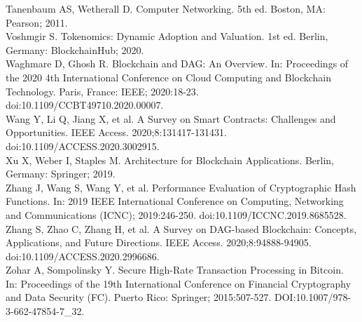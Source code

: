 \documentclass[12pt,a4paper,twocolumn]{article}
\begin{document}
Tanenbaum AS, Wetherall D. Computer Networking. 5th ed. Boston, MA: Pearson; 2011.\\

Voshmgir S. Tokenomics: Dynamic Adoption and Valuation. 1st ed. Berlin, Germany: BlockchainHub; 2020.\\

Waghmare D, Ghosh R. Blockchain and DAG: An Overview. In: Proceedings of the 2020 4th International Conference on Cloud Computing and Blockchain Technology. Paris, France: IEEE; 2020:18-23. doi:10.1109/CCBT49710.2020.00007.\\

Wang Y, Li Q, Jiang X, et al. A Survey on Smart Contracts: Challenges and Opportunities. IEEE Access. 2020;8:131417-131431. doi:10.1109/ACCESS.2020.3002915.\\

Xu X, Weber I, Staples M. Architecture for Blockchain Applications. Berlin, Germany: Springer; 2019.\\

Zhang J, Wang S, Wang Y, et al. Performance Evaluation of Cryptographic Hash Functions. In: 2019 IEEE International Conference on Computing, Networking and Communications (ICNC); 2019:246-250. doi:10.1109/ICCNC.2019.8685528.\\

Zhang S, Zhao C, Zhang H, et al. A Survey on DAG-based Blockchain: Concepts, Applications, and Future Directions. IEEE Access. 2020;8:94888-94905. doi:10.1109/ACCESS.2020.2996686.\\

Zohar A, Sompolinsky Y. Secure High-Rate Transaction Processing in Bitcoin. In: Proceedings of the 19th International Conference on Financial Cryptography and Data Security (FC). Puerto Rico: Springer; 2015:507-527. DOI:10.1007/978-3-662-47854-7\_32.\\
\end{document}
